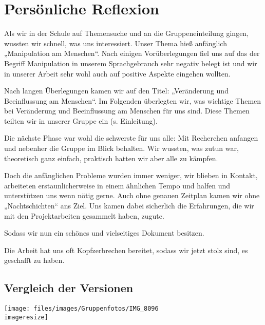 \chapter{Persönliche Reflexion}
\label{sec:reflexion}

Als wir in der Schule auf Themensuche und an die Gruppeneinteilung gingen, wussten wir schnell, was
uns interessiert. Unser Thema hieß anfänglich „Manipulation am Menschen“. Nach einigen
Vorüberlegungen fiel uns auf das der Begriff Manipulation in unserem Sprachgebrauch sehr negativ
belegt ist und wir in unserer Arbeit sehr wohl auch auf positive Aspekte eingehen wollten.

Nach langen Überlegungen kamen wir auf den Titel: „Veränderung und Beeinflussung am Menschen“. Im
Folgenden überlegten wir, was wichtige Themen bei Veränderung und Beeinflussung am Menschen für uns
sind. Diese Themen teilten wir in unserer Gruppe ein (s. Einleitung).

Die nächste Phase war wohl die schwerste für uns alle: Mit Recherchen anfangen und nebenher die
Gruppe im Blick behalten. Wir wussten, was zutun war, theoretisch ganz einfach, praktisch hatten
wir aber alle zu kämpfen.

Doch die anfänglichen Probleme wurden immer weniger, wir blieben in Kontakt, arbeiteten
erstaunlicherweise in einem ähnlichen Tempo und halfen und unterstützen uns wenn nötig gerne. Auch
ohne genauen Zeitplan kamen wir ohne „Nachtschichten“ ans Ziel. Uns kamen dabei sicherlich die
Erfahrungen, die wir mit den Projektarbeiten gesammelt haben, zugute.

Sodass wir nun ein schönes und vielseitiges Dokument besitzen.

Die Arbeit hat uns oft Kopfzerbrechen bereitet, sodass wir jetzt stolz sind, es geschafft zu haben.

\section{Vergleich der Versionen}


\begin{figurewrapper}
	\texttt{[image: files/images/Gruppenfotos/IMG\_8096\\imageresize]}
	\label{fig:group_picture}
\end{figurewrapper}
